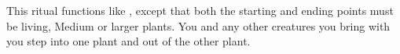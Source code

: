 \spelleffect This ritual functions like , except that both the starting and ending points must be living, Medium or larger plants. You and any other creatures you bring with you step into one plant and out of the other plant.
\begin{comment}
You can enter any normal plant (Medium or larger) and pass any distance to a plant of the same kind in a single round, regardless of the distance separating the two. The entry plant must be alive. The destination plant need not be familiar to you, but it also must be alive. If you are uncertain of the location of a particular kind of destination plant, you need merely designate direction and distance and the transport via plants spell moves you as close as possible to the desired location. If a particular destination plant is desired but the plant is not living, the spell fails and you are ejected from the entry plant.
\par After completing the spell, you and anyone bring with you can't take any actions until the next turn that each creature would have.
\par You can bring along objects as long as their weight doesn't exceed your maximum load. You may also bring one additional willing Medium or smaller creature (carrying gear or objects up to its maximum load) or its equivalent per three caster levels. Use the following equivalents to determine the maximum number of larger creatures you can bring along: A Large creature counts as two Medium creatures, a Huge creature counts as two Large creatures, and so forth. All creatures to be transported must be in contact with one another, and at least one of those creatures must be in contact with you.
\par You can't use this spell to travel through plant creatures.
\par The destruction of an occupied plant slays you and any creatures you have brought along, and ejects the bodies and all carried objects from the tree.
\end{comment}

